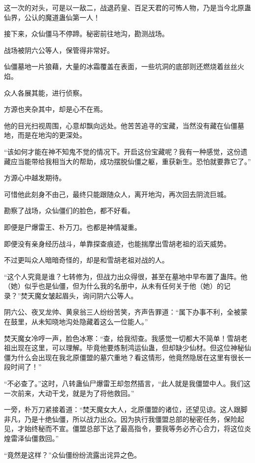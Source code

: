 \begin{this_body}
这一次的对头，可是以一敌二，战退药皇、百足天君的可怖人物，乃是当今北原蛊仙界，公认的魔道蛊仙第一人！

接下来，众仙僵马不停蹄。秘密前往地沟，勘测战场。

战场被阴六公等人，保管得非常好。

仙僵墓地一片狼藉，大量的冰霜覆盖在表面，一些坑洞的底部则还燃烧着丝丝火焰。

众人各展其能，进行侦察。

方源也夹杂其中，却是心不在焉。

他的目光扫视周围，心意却飘向远处。他苦苦追寻的宝藏，当然没有藏在仙僵墓地，而是在地沟的更深处。

“该如何才能在神不知鬼不觉的情况下。开启这份宝藏呢？我有一种感觉，这份遗藏应当能带给我相当大的帮助，成功摆脱仙僵之躯，重获新生。恐怕就要靠它了。”

方源心中越发期待。

可惜他此刻身不由己，最终只能跟随众人，离开地沟，再次回去阴流巨城。

勘察了战场，众仙僵们的脸色，都不好看。

即便是尸爆雷王、朴万刀。也都是神情凝重。

即便没有亲身经历战斗，单靠探查痕迹，也能揣摩出雪胡老祖的滔天威势。

不过更叫众人暗暗奇怪的，却是和雪胡老祖对战的人。

“这个人究竟是谁？七转修为，但战力出众得很，甚至在墓地中早布置了蛊阵。他（她）似乎也是仙僵，但为什么我的名册中，从未有任何关于他（她）的记录？”焚天魔女皱起眉头，询问阴六公等人。

阴六公、夜叉龙帅、黄泉翁三人纷纷苦笑，齐声告罪道：“属下办事不利，全被蒙在鼓里，从未知晓地沟处隐藏着这么一位能人。”

焚天魔女冷哼一声，脸色冰寒：“查，给我彻查。我感觉一切都大不简单！雪胡老祖出现在这里，可以理解。毕竟他要炼制鸿运仙蛊，但却缺少仙材。但这位神秘仙僵为什么会出现在我北原僵盟的墓穴重地？看这情形，他竟然隐居在这里有很长一段时间了！”

“不必查了。”这时，八转蛊仙尸爆雷王却忽然插言，“此人就是我僵盟中人。我们这一次前来，大动干戈，就是为了将他救回。”

一旁，朴万刀紧接着道：“焚天魔女大人，北原僵盟的诸位，还望见谅。这人跟脚非凡，乃是十绝仙僵，所以战力出众。因为执行我僵盟总部的秘密任务，保险起见，才始终秘而不宣。僵盟总部下达了最高指令，要我等务必齐心合力，将这位炎煌雷泽仙僵救回。”

“竟然是这样？”众仙僵纷纷流露出诧异之色。


\end{this_body}
